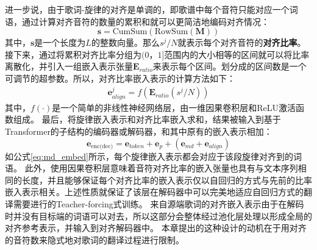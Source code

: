 进一步说，由于歌词-旋律的对齐是单调的，即歌谱中每个音符只能对应一个词语，通过计算对齐音符的数量的累积和就可以更简洁地编码对齐情况：
\begin{equation}
\label{eq:cumsum}
    \mathbf{s} = \text{CumSum}(\text{RowSum}(\mathbf{M}))
\end{equation}
其中，$\mathbf{s}$是一个长度为$L$的整数向量。那么$s^j / N$就表示每个对齐音符的\textbf{对齐比率}。
接下来，通过将累积对齐比率分组为$(0，1]$范围内的大小相等的区间就可以将比率离散化，并引入一组嵌入表示张量$\mathbf{E}_{ratio}$来表示每个区间。划分成的区间数是一个可调节的超参数。所以，对齐比率嵌入表示的计算方法如下：
\begin{align}
\label{eq:align}
    \mathbf{e}_{align}^j = f(\mathbf{E}_{ratio}(s^j / N))
\end{align}
其中，$f(\cdot)$是一个简单的非线性神经网络层，由一维因果卷积层和ReLU激活函数组成。
最后，将旋律嵌入表示和对齐比率嵌入求和，结果被输入到基于Transformer的子结构的编码器或解码器，和其中原有的嵌入表示相加：
\begin{equation}
\label{eq:embed}
    \mathbf{e}_{\text{enc(dec)}} = \mathbf{e}_{token} + \mathbf{e}_p + (\mathbf{e}_{md} + \mathbf{e}_{align})
\end{equation}
如公式\ref{eq:md_embed}所示，每个旋律嵌入表示都会对应于该段旋律对齐到的词语。
此外，使用因果卷积层意味着音符对齐比率的嵌入张量也具有与文本序列相同的长度，并且能够保证每个对齐比率的嵌入表示仅以自回归的方式与先前的比率嵌入表示相关。上述性质就保证了该层在解码器中可以完美地适应自回归方式的翻译需要进行的Teacher-forcing式训练。
来自源端歌词的对齐嵌入表示由于在解码时并没有目标端的词语可以对去，所以这部分会整体经过池化层处理以形成全局的对齐参考表示，并输入到对齐解码器中。
本章提出的这种设计的动机在于用对齐的音符数来隐式地对歌词的翻译过程进行限制。

